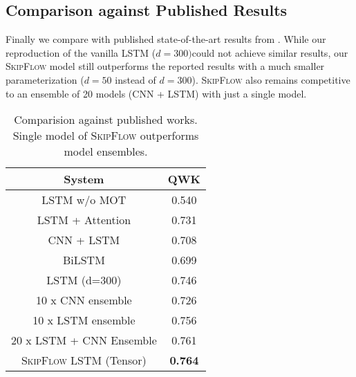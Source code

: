 \documentclass[letterpaper]{article}
\begin{document}
\subsection{Comparison against Published Results}
Finally we compare with published state-of-the-art results from \cite{DBLP:conf/emnlp/TaghipourN16}. While our reproduction of the vanilla LSTM ($d=300) $could not achieve similar results, our \textsc{SkipFlow} model still outperforms the reported results with a much smaller parameterization ($d=50$ instead of $d=300$). \textsc{SkipFlow} also remains competitive to an ensemble of 20 models (CNN + LSTM) with just a single model. 

\begin{table}[htbp]
  \centering
  \small
    \begin{tabular}{|c|c|}
    \hline
    System &  QWK \\
    \hline
    
    LSTM w/o MOT & 0.540 \\
    LSTM + Attention & 0.731 \\
    CNN + LSTM &0.708 \\
    BiLSTM &  0.699 \\
    LSTM (d=300) & 0.746 \\
     10 x CNN ensemble  & 0.726 \\
    10 x LSTM ensemble   & 0.756 \\
    20 x LSTM + CNN Ensemble & 0.761 \\
    \hline
    \textsc{SkipFlow} LSTM (Tensor) &   \textbf{0.764} \\
   \hline
    
    \end{tabular}\caption{Comparision against published works. Single model of \textsc{SkipFlow} outperforms model ensembles.}
    \label{tab:pub_compare}
    \end{table}
\end{document}
